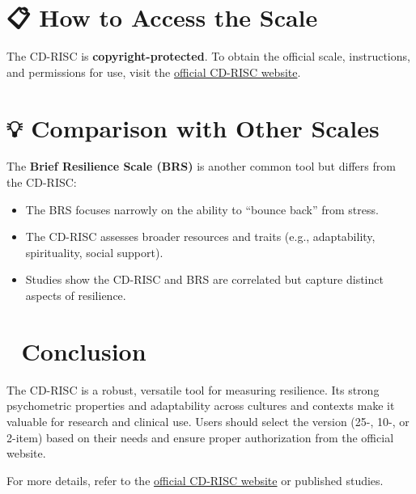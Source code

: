 \documentclass[12pt]{article}
\begin{document}
\section*{📋 How to Access the Scale}

The CD-RISC is \textbf{copyright-protected}. To obtain the official scale, instructions, and permissions for use, visit the \href{https://www.connordavidson-resiliencescale.com/}{official CD-RISC website}.

\section*{💡 Comparison with Other Scales}

The \textbf{Brief Resilience Scale (BRS)} is another common tool but differs from the CD-RISC:
\begin{itemize}
    \item The BRS focuses narrowly on the ability to ``bounce back'' from stress.
    \item The CD-RISC assesses broader resources and traits (e.g., adaptability, spirituality, social support).
    \item Studies show the CD-RISC and BRS are correlated but capture distinct aspects of resilience.
\end{itemize}

\section*{💎 Conclusion}

The CD-RISC is a robust, versatile tool for measuring resilience. Its strong psychometric properties and adaptability across cultures and contexts make it valuable for research and clinical use. Users should select the version (25-, 10-, or 2-item) based on their needs and ensure proper authorization from the official website.

For more details, refer to the \href{https://www.connordavidson-resiliencescale.com/}{official CD-RISC website} or published studies.
\end{document}
